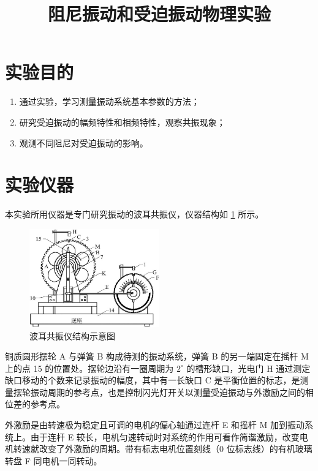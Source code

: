 \documentclass[12pt,a4paper]{amsart}
\title{阻尼振动和受迫振动物理实验}
\begin{document}
\maketitle

\section{实验目的}

\begin{enumerate}
	\item 通过实验，学习测量振动系统基本参数的方法；
	\item 研究受迫振动的幅频特性和相频特性，观察共振现象；
	\item 观测不同阻尼对受迫振动的影响。
\end{enumerate}

\section{实验仪器}

本实验所用仪器是专门研究振动的波耳共振仪，仪器结构如 \ref{fig:instruments} 所示。

\begin{figure}[H]
	\centering
	\includegraphics[width=0.5\textwidth]{img/instruments.jpg}
	\caption{波耳共振仪结构示意图}
	\label{fig:instruments}
\end{figure}

铜质圆形摆轮 A 与弹簧 B 构成待测的振动系统，弹簧 B 的另一端固定在摇杆 M 上的点 15 的位置处。摆轮边沿有一圈周期为 $2^\circ$ 的槽形缺口，光电门 H 通过测定缺口移动的个数来记录振动的幅度，其中有一长缺口 C 是平衡位置的标志，是测量摆轮振动周期的参考点，也是控制闪光灯开关以测量受迫振动与外激励之间的相位差的参考点。

外激励是由转速极为稳定且可调的电机的偏心轴通过连杆 E 和摇杆 M 加到振动系统上。由于连杆 E 较长，电机匀速转动时对系统的作用可看作简谐激励，改变电机转速就改变了外激励的周期。带有标志电机位置刻线（0 位标志线）的有机玻璃转盘 F 同电机一同转动。
\end{document}
